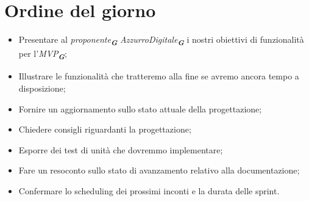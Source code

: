 

\section{Ordine del giorno}

\begin{itemize}
    \item Presentare al \emph{proponente}\textsubscript{\textbf{\textit{G}}} \emph{AzzurroDigitale}\textsubscript{\textbf{\textit{G}}}
    i nostri obiettivi di funzionalità per l'\emph{MVP}\textsubscript{\textbf{\textit{G}}};
    \item Illustrare le funzionalità che tratteremo alla fine se avremo ancora tempo a disposizione;
    \item Fornire un aggiornamento sullo stato attuale della progettazione;
    \item Chiedere consigli riguardanti la progettazione;
    \item Esporre dei test di unità che dovremmo implementare;
    \item Fare un resoconto sullo stato di avanzamento relativo alla documentazione;
    \item Confermare lo scheduling dei prossimi inconti e la durata delle sprint.
\end{itemize}